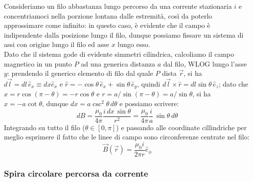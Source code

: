 \documentclass[]{article}
\begin{document}
Consideriamo un filo abbastanza lungo percorso da una corrente stazionaria $ i $ e concentriamoci nella porzione lontana dalle estremità, così da poterlo approssimare come infinito: in questo caso, è evidente che il campo è indipendente dalla posizione lungo il filo, dunque possiamo fissare un sistema di assi con origine lungo il filo ed asse $ x $ lungo esso. \\ 
%
Dato che il sistema gode di evidente simmetri cilindrica, calcoliamo il campo magnetico in un punto $ P $ ad una generica distanza $ a $ dal filo, WLOG lungo l'asse $ y $: prendendo il generico elemento di filo dal quale $ P $ dista $ \vec{r} $, si ha $ d\vec{l} = dl \, \hat{e}_x \equiv dx \hat{e}_x $ e $ \hat{r} = -\cos{\theta} \, \hat{e}_x + \sin{\theta} \, \hat{e}_y $, quindi $ d\vec{l} \times \hat{r} = dl \sin{\theta} \, \hat{e}_z $; dato che $ x = r \cos{(\pi - \theta)} = - r \cos{\theta} $ e $ r = a / \sin{(\pi - \theta)} = a / \sin{\theta} $, si ha $ x = - a \cot{\theta} $, dunque $ dx = a \csc^2{\theta} \, d\theta $ e possiamo scrivere:
\begin{equation}
	dB = \displaystyle\frac{\mu_0}{4\pi} \displaystyle\frac{i\, dx \, \sin{\theta}}{r^2} = \displaystyle\frac{\mu_0}{4\pi} \displaystyle\frac{i}{a} \, \sin{\theta} \, d\theta
	\label{eq:filo-calc}
\end{equation}
Integrando su tutto il filo ($ \theta \in [0, \pi] $) e passando alle coordinate cillindriche per meglio esprimere il fatto che le linee di campo sono circonferenze centrate nel filo:
\begin{equation}
	\vec{B}(\vec{r}) = \displaystyle\frac{\mu_0 i}{2\pi r} \hat{e}_{\phi}
	\label{eq:mag-filo-corr}
\end{equation}

\subsubsection{Spira circolare percorsa da corrente}
\end{document}

